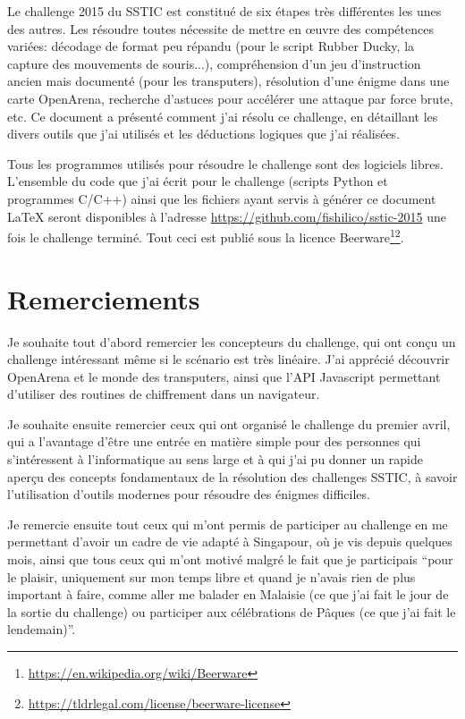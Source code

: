 \documentclass[a4paper,10pt]{article}
\begin{document}
Le challenge 2015 du SSTIC est constitué de six étapes très différentes les unes des autres.
Les résoudre toutes nécessite de mettre en œuvre des compétences variées: décodage de format peu répandu (pour le script Rubber Ducky, la capture des mouvements de souris...), compréhension d'un jeu d'instruction ancien mais documenté (pour les transputers), résolution d'une énigme dans une carte OpenArena, recherche d'astuces pour accélérer une attaque par force brute, etc.
Ce document a présenté comment j'ai résolu ce challenge, en détaillant les divers outils que j'ai utilisés et les déductions logiques que j'ai réalisées.

Tous les programmes utilisés pour résoudre le challenge sont des logiciels libres.
L'ensemble du code que j'ai écrit pour le challenge (scripts Python et programmes C/C++) ainsi que les fichiers ayant servis à générer ce document \LaTeX{} seront disponibles à l'adresse \url{https://github.com/fishilico/sstic-2015} une fois le challenge terminé.
Tout ceci est publié sous la licence Beerware\footnote{\url{https://en.wikipedia.org/wiki/Beerware}}\footnote{\url{https://tldrlegal.com/license/beerware-license}}.

\section{Remerciements}

Je souhaite tout d'abord remercier les concepteurs du challenge, qui ont conçu un challenge intéressant même si le scénario est très linéaire.
J'ai apprécié découvrir OpenArena et le monde des transputers, ainsi que l'API Javascript permettant d'utiliser des routines de chiffrement dans un navigateur.

Je souhaite ensuite remercier ceux qui ont organisé le challenge du premier avril, qui a l'avantage d'être une entrée en matière simple pour des personnes qui s'intéressent à l'informatique au sens large et à qui j'ai pu donner un rapide aperçu des concepts fondamentaux de la résolution des challenges SSTIC, à savoir l'utilisation d'outils modernes pour résoudre des énigmes difficiles.

Je remercie ensuite tout ceux qui m'ont permis de participer au challenge en me permettant d'avoir un cadre de vie adapté à Singapour, où je vis depuis quelques mois, ainsi que tous ceux qui m'ont motivé malgré le fait que je participais ``pour le plaisir, uniquement sur mon temps libre et quand je n'avais rien de plus important à faire, comme aller me balader en Malaisie (ce que j'ai fait le jour de la sortie du challenge) ou participer aux célébrations de Pâques (ce que j'ai fait le lendemain)''.
\end{document}
